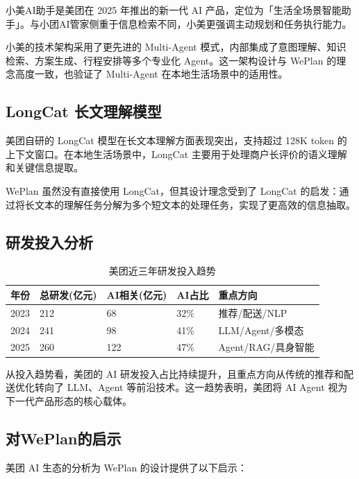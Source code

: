 \documentclass[12pt,a4paper]{ctexart}
\begin{document}
小美AI助手是美团在 2025 年推出的新一代 AI 产品，定位为「生活全场景智能助手」。与小团AI管家侧重于信息检索不同，小美更强调主动规划和任务执行能力。

小美的技术架构采用了更先进的 Multi-Agent 模式，内部集成了意图理解、知识检索、方案生成、行程安排等多个专业化 Agent。这一架构设计与 WePlan 的理念高度一致，也验证了 Multi-Agent 在本地生活场景中的适用性。

\subsection{LongCat 长文理解模型}

美团自研的 LongCat 模型在长文本理解方面表现突出，支持超过 128K token 的上下文窗口。在本地生活场景中，LongCat 主要用于处理商户长评价的语义理解和关键信息提取。

WePlan 虽然没有直接使用 LongCat，但其设计理念受到了 LongCat 的启发：通过将长文本的理解任务分解为多个短文本的处理任务，实现了更高效的信息抽取。

\subsection{研发投入分析}

\begin{table}[H]
\centering
\caption{美团近三年研发投入趋势}
\label{tab:meituan-rd}
\renewcommand{\arraystretch}{1.3}
\begin{tabular}{p{2cm} p{3cm} p{3cm} p{2cm} p{3cm}}
\toprule
\textbf{年份} & \textbf{总研发(亿元)} & \textbf{AI相关(亿元)} & \textbf{AI占比} & \textbf{重点方向} \\
\midrule
2023 & 212 & 68 & 32\% & 推荐/配送/NLP \\
2024 & 241 & 98 & 41\% & LLM/Agent/多模态 \\
2025 & 260 & 122 & 47\% & Agent/RAG/具身智能 \\
\bottomrule
\end{tabular}
\end{table}

从投入趋势看，美团的 AI 研发投入占比持续提升，且重点方向从传统的推荐和配送优化转向了 LLM、Agent 等前沿技术。这一趋势表明，美团将 AI Agent 视为下一代产品形态的核心载体。

\subsection{对WePlan的启示}

美团 AI 生态的分析为 WePlan 的设计提供了以下启示：
\end{document}
